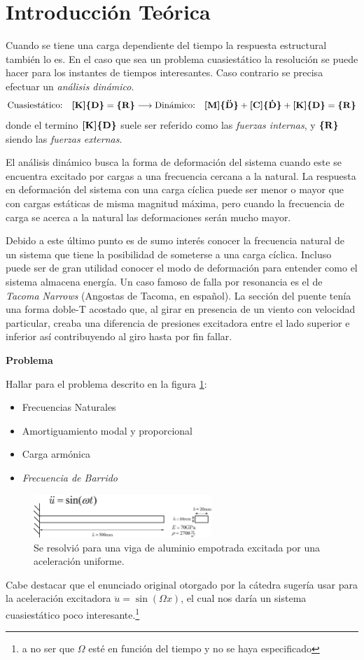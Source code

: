 \documentclass[onecolumn,10pt,titlepage,a4paper]{article}
\begin{document}
\tableofcontents

\section{Introducción Teórica}
Cuando se tiene una carga dependiente del tiempo la respuesta estructural también lo es. En el caso que sea un problema cuasiestático la resolución se puede hacer para los instantes de tiempos interesantes. Caso contrario se precisa efectuar un \textit{análisis dinámico}.
\[
\text{Cuasiestático:}\quad \boldsymbol{[}\mathbf{K} \boldsymbol{]}\boldsymbol{\{ }\mathbf{D} \boldsymbol{\}} = \boldsymbol{\{ }\mathbf{R} \boldsymbol{\}} \longrightarrow \text{Dinámico:} \quad 
\boldsymbol{[}\mathbf{M} \boldsymbol{]} \boldsymbol{\{ }\mathbf{\ddot{D}} \boldsymbol{\}} + \boldsymbol{[}\mathbf{C} \boldsymbol{]}\boldsymbol{\{ }\mathbf{\dot{D}} \boldsymbol{\}} + \boldsymbol{[}\mathbf{K} \boldsymbol{]}\boldsymbol{\{ }\mathbf{D} \boldsymbol{\}} = \boldsymbol{\{ }\mathbf{R} \boldsymbol{\}}	
\]
donde el termino $\boldsymbol{[}\mathbf{K} \boldsymbol{]}\boldsymbol{\{ }\mathbf{D} \boldsymbol{\}}$ suele ser referido como las \textit{fuerzas internas}, y $\boldsymbol{\{ }\mathbf{R} \boldsymbol{\}}$ siendo las \textit{fuerzas externas}.

El análisis dinámico busca la forma de deformación del sistema cuando este se encuentra excitado por cargas a una frecuencia cercana a la natural. La respuesta en deformación del sistema con una carga cíclica puede ser menor o mayor que con cargas estáticas de misma magnitud máxima, pero cuando la frecuencia de carga se acerca a la natural las deformaciones serán mucho mayor. 

Debido a este último punto es de sumo interés conocer la frecuencia natural de un sistema que tiene la posibilidad de someterse a una carga cíclica. Incluso puede ser de gran utilidad conocer el modo de deformación para entender como el sistema almacena energía. Un caso famoso de falla por resonancia es el de \textit{Tacoma Narrows} (Angostas de Tacoma, en español). La sección del puente tenía una forma doble-T acostado que, al girar en presencia de un viento con velocidad particular, creaba una diferencia de presiones excitadora entre el lado superior e inferior así contribuyendo al giro hasta por fin fallar.

{\textbf{Problema}}\par
Hallar para el problema descrito en la figura \ref{fig:enunciado}:
\begin{itemize}
	\item Frecuencias Naturales
	\item Amortiguamiento modal y proporcional
	\item Carga armónica
	\item \textit{Frecuencia de Barrido}
\end{itemize}

\begin{figure}[htb!]
	\centering
	\includegraphics[width=0.6\textwidth]{fig/enunciado.eps}
	\caption{Se resolvió para una viga de aluminio empotrada excitada por una aceleración uniforme.}\label{fig:enunciado}
\end{figure}
Cabe destacar que el enunciado original otorgado por la cátedra sugería usar para la aceleración excitadora $\ddot{u}=\sin (\Omega x)$, el cual nos daría un sistema cuasiestático poco interesante.\footnote{a no ser que $\Omega$ esté en función del tiempo y no se haya especificado}
\end{document}
